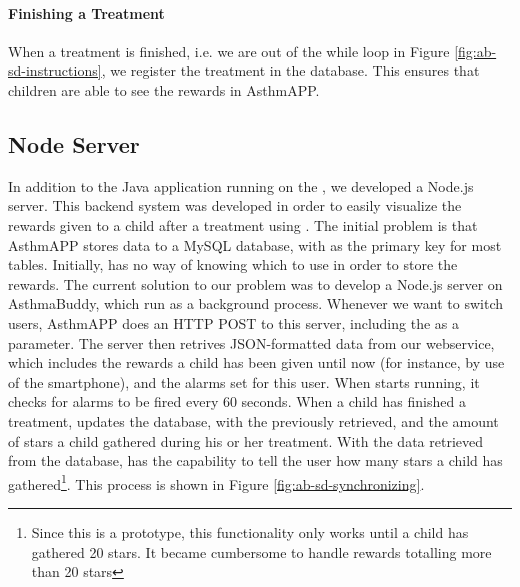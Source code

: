 \paragraph{Finishing a Treatment}
When a treatment is finished, i.e. we are out of the while loop in Figure \ref{fig:ab-sd-instructions}, we register the treatment in the database. This ensures that children are able to see the rewards in AsthmAPP. 


\subsection{Node Server}
\label{sec:node-server}
In addition to the Java application running on the \rpi{}, we developed a Node.js server. This backend system was developed in order to easily visualize the rewards given to a child after a treatment using \buddy{}. The initial problem is that AsthmAPP stores data to a MySQL database, with  as the primary key for most tables. Initially, \buddy{} has no way of knowing which  to use in order to store the rewards. The current solution to our problem was to develop a Node.js server on AsthmaBuddy, which run as a background process. Whenever we want to switch users, AsthmAPP does an HTTP POST to this server, including the  as a parameter. The server then retrives JSON-formatted data from our webservice, which includes the rewards a child has been given until now (for instance, by use of the smartphone), and the alarms set for this user. 
When \buddy{} starts running, it checks for alarms to be fired every 60 seconds. When a child has finished a treatment,  updates the database, with the  previously retrieved, and the amount of stars a child gathered during his or her treatment. With the data retrieved from the database, \buddy{} has the capability to tell the user how many stars a child has gathered\footnote{Since this is a prototype, this functionality only works until a child has gathered 20 stars. It became cumbersome to handle rewards totalling more than 20 stars}. This process is shown in Figure \ref{fig:ab-sd-synchronizing}.

